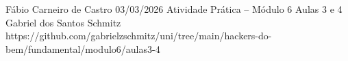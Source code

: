 \documentclass{article}
\begin{document}
{Fábio Carneiro de Castro}
{03/03/2026}
{Atividade Prática -- Módulo 6}
{Aulas 3 e 4}
{Gabriel dos Santos Schmitz}
{https://github.com/gabrielzschmitz/uni/tree/main/hackers-do-bem/fundamental/modulo6/aulas3-4}




\newpage
\printbibliography[title=Referências]
\end{document}

